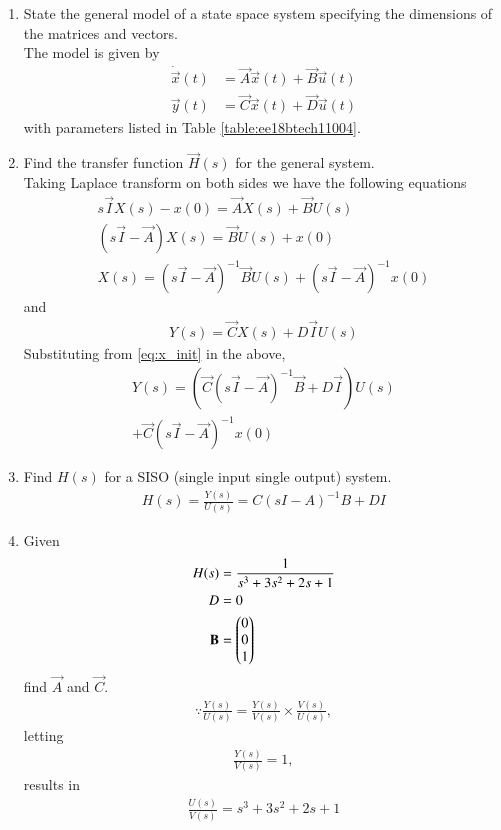 \begin{enumerate}[label=\thesection.\arabic*.,ref=\thesection.\theenumi]
\item State the general model of a state space system specifying the dimensions of the matrices and vectors.
\\
\solution The model is given by 
\begin{align}
\dot{\vec{x}}(t)&=\vec{A}\vec{x}(t)+\vec{B}\vec{u}(t) \\
 \vec{y}(t)&=\vec{C}\vec{x}(t)+\vec{D} \vec{u}(t)
\end{align}
%
with parameters listed in Table \ref{table:ee18btech11004}.
%
\begin{table}[!ht]
\centering

\caption{}
\label{table:ee18btech11004}
\end{table}
\item Find the transfer function $\vec{H}(s)$ for the general system.
\\
\solution 
Taking Laplace transform on both sides we have the following equations
\begin{align}
s\vec{I}X(s)-x(0)= \vec{A}X(s)+ \vec{B}U(s)\\
(s\vec{I}-\vec{A})X(s)= \vec{B}U(s)+ x(0)\\
X(s)={(s\vec{I}-\vec{A})^{-1}}\vec{B} U(s)+ (s\vec{I}-\vec{A})^{-1}x(0)
\label{eq:x_init}
\end{align}
and
\begin{align}
Y(s)= \vec{C}X(s)+D\vec{I}U(s)
\end{align}
Substituting from \eqref{eq:x_init} in the above,
%
\begin{multline}
Y(s)=( \vec{C}{(s\vec{I}-\vec{A})^{-1}}\vec{B}+D\vec{I}) U(s) 
\\
+ \vec{C}(s\vec{I}-\vec{A})^{-1}x(0)
\end{multline}
%
\item Find $H(s)$ for a SISO (single input single output) system.
\\
\solution
\begin{align}
H(s)= {\frac{Y(s)}{U(s)}}= C{(sI-A)^{-1}}B+DI
\end{align}

\item Given 
\begin{align}
H(s)&=\frac{1}{s^3+3s^2+2s+1}
\\
D&=0
\\
\mathbf{B}&= \begin{pmatrix}0\\0\\1\end{pmatrix}
\end{align}
%
 find $\vec{A}$ and $\vec{C}$.
\\
\solution 
\begin{align} 
\because {\frac{Y(s)}{U(s)}}= \frac{Y(s)}{V(s)} \times \frac{V(s)}{U(s)},
\end{align}
letting
\begin{align}
 {\frac{Y(s)}{V(s)}}= 1, 
\end{align}
results in 
\begin{align}
{\frac{U(s)}{V(s)}}={s^3 + 3s^2+2s + 1}
\end{align}


\end{enumerate}
